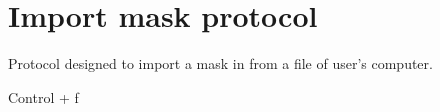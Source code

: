 \section{Import mask protocol}
\label{app:importMask}%
Protocol designed to import a mask in \scipion from a file of user's computer.

Control + f
